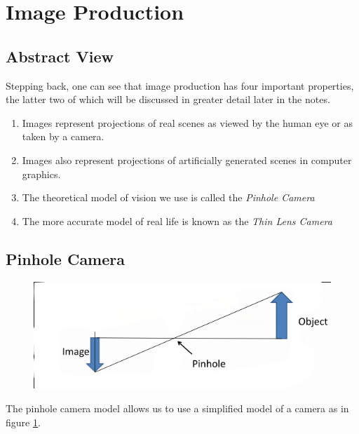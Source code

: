 \documentclass{article}
\begin{document}
\section{Image Production}
\subsection{Abstract View}
Stepping back, one can see that image production has four important properties, the latter two of which will be discussed in greater detail later in the notes.
\begin{enumerate}
	\item Images represent projections of real scenes as viewed by the human eye or as taken by a camera.
	\item Images also represent projections of artificially generated scenes in computer graphics.
	\item The theoretical model of vision we use is called the {\it Pinhole Camera}
	\item The more accurate model of real life is known as the {\it Thin Lens Camera}
\end{enumerate}
\subsection{Pinhole Camera}

\begin{figure}[h]
	\includegraphics[width=\textwidth]{pinhole.png}
	\label{fig:pinhole}
\end{figure}
The pinhole camera model allows us to use a simplified model of a camera as in figure \ref{fig:pinhole}.
\end{document}
